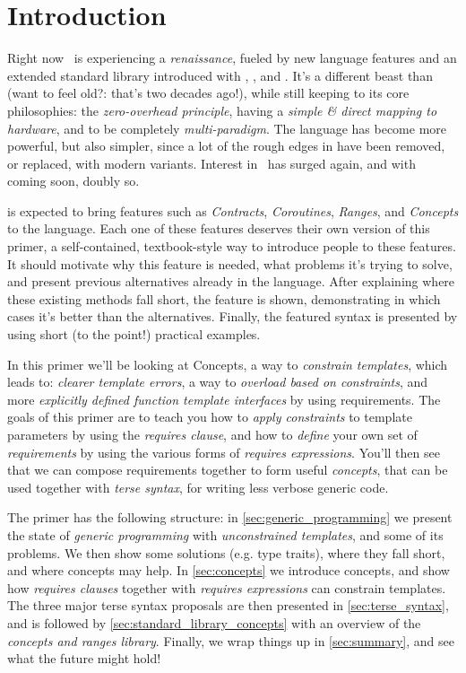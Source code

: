 \section{Introduction} \label{sec:introduction}

Right now \Cpp\ is experiencing a \emph{renaissance}, fueled by new language features and an extended standard library introduced with , , and . It's a different beast than  (want to feel old?: that's two decades ago!), while still keeping to its core philosophies: the \emph{zero-overhead principle}, having a \emph{simple \& direct mapping to hardware}, and to be completely \emph{multi-paradigm}. The language has become more powerful, but also simpler, since a lot of the rough edges in  have been removed, or replaced, with modern variants. Interest in \Cpp\ has surged again, and with  coming soon\texttrademark, doubly so.

 is expected to bring features such as \emph{Contracts}, \emph{Coroutines}, \emph{Ranges}, and \emph{Concepts} to the language. Each one of these features deserves their own version of this primer, a self-contained, textbook-style way to introduce people to these features. It should motivate why this feature is needed, what problems it's trying to solve, and present previous alternatives already in the language. After explaining where these existing methods fall short, the feature is shown, demonstrating in which cases it's better than the alternatives. Finally, the featured syntax is presented by using short (to the point!) practical examples.

In this primer we'll be looking at Concepts, a way to \emph{constrain templates}, which leads to: \emph{clearer template errors}, a way to \emph{overload based on constraints}, and more \emph{explicitly defined function template interfaces} by using requirements. The goals of this primer are to teach you how to \emph{apply constraints} to template parameters by using the \emph{requires clause}, and how to \emph{define} your own set of \emph{requirements} by using the various forms of \emph{requires expressions}. You'll then see that we can compose requirements together to form useful \emph{concepts}, that can be used together with \emph{terse syntax}, for writing less verbose generic code.

The primer has the following structure: in \cref{sec:generic_programming} we present the state of \emph{generic programming} with \emph{unconstrained templates}, and some of its problems. We then show some solutions (e.g. type traits), where they fall short, and where concepts may help. In \cref{sec:concepts} we introduce concepts, and show how \emph{requires clauses} together with \emph{requires expressions} can constrain templates. The three major terse syntax proposals are then presented in \cref{sec:terse_syntax}, and is followed by \cref{sec:standard_library_concepts} with an overview of the \emph{concepts and ranges library}. Finally, we wrap things up in \cref{sec:summary}, and see what the future might hold!

